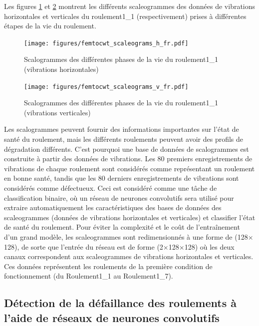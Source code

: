 Les figures \ref{fig:bearings_fault_progress_scaleograms_h} et \ref{fig:bearings_fault_progress_scaleograms_v} montrent les différents scaleogrammes des données de vibrations horizontales et verticales du roulement1\_1 (respectivement) prises à différentes étapes de la vie du roulement.

\begin{figure}[h]
	\centering
	\texttt{[image: figures/femtocwt\_scaleograms\_h\_fr.pdf]}
	\caption{Scalogrammes des différentes phases de la vie du roulement1\_1 (vibrations horizontales)}%
	\label{fig:bearings_fault_progress_scaleograms_h}
\end{figure}

\begin{figure}[h]
	\centering
	\texttt{[image: figures/femtocwt\_scaleograms\_v\_fr.pdf]}
	\caption{Scalogrammes des différentes phases de la vie du roulement1\_1 (vibrations verticales)}%
	\label{fig:bearings_fault_progress_scaleograms_v}
\end{figure}

Les scalogrammes peuvent fournir des informations importantes sur l'état de santé du roulement, mais les différents roulements peuvent avoir des profils de dégradation différents. C'est pourquoi une base de données de scalogrammes est construite à partir des données de vibrations. Les 80 premiers enregistrements de vibrations de chaque roulement sont considérés comme représentant un roulement en bonne santé, tandis que les 80 derniers enregistrements de vibrations sont considérés comme défectueux. Ceci est considéré comme une tâche de classification binaire, où un réseau de neurones convolutifs sera utilisé pour extraire automatiquement les caractéristiques des bases de données des scaleogrammes (données de vibrations horizontales et verticales) et classifier l'état de santé du roulement. Pour éviter la complexité et le coût de l'entraînement d'un grand modèle, les scaleogrammes sont redimensionnés à une forme de (128$\times$128), de sorte que l'entrée du réseau est de forme (2$\times$128$\times$128) où les deux canaux correspondent aux scaleogrammes de vibrations horizontales et verticales. Ces données représentent les roulements de la première condition de fonctionnement (du Roulement1\_1 au Roulement1\_7).

\subsection{Détection de la défaillance des roulements à l'aide de réseaux de neurones convolutifs}%
\label{sub:detecting_bearings_failure_using_convolutional_neural_networks}

